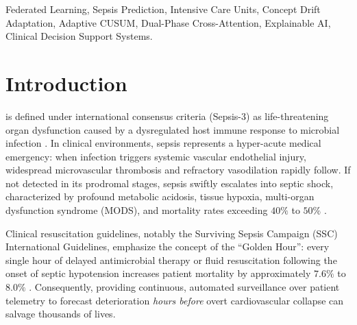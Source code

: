 \documentclass[journal,twocolumn,10pt]{IEEEtran}
\begin{document}
\begin{abstract}
AUPRC of \textbf{0.1043}, lowest ECE of \textbf{0.0902}, and lowest Brier score of \textbf{0.0548}. Paired cluster bootstrap testing confirms statistically equivalent discrimination to centralized BiLSTM ($P = .176$) and personalized Ditto ($P = .459$) while delivering superior probability reliability. Depending on clinical deployment requirements, FPDAF supports flexible operating modes, ranging from an \textbf{Early Bedside Screening mode} ($\tau=0.08$, Sensitivity 80.15\%, Specificity 63.85\%) to a \textbf{High-Confidence Rule-In mode} ($\tau=0.65$, Accuracy 96.20\%, Specificity 97.80\%). In a theoretical 50-round deployment model, CSSP achieves up to 38.0\% communication savings (1.52~GB vs. 2.48~GB in Ditto). Paired with an operational point-of-care Clinical Decision Support System (CDSS) providing temporal window attributions, physiological feature saliency, and counterfactual intervention simulation with a cohort mean early warning lead time of \textbf{4.98 hours} (up to 5.8 hours in exemplar cases), FPDAF provides an empirically grounded, privacy-preserving foundation for decentralized early sepsis surveillance.
\end{abstract}

\begin{IEEEkeywords}
Federated Learning, Sepsis Prediction, Intensive Care Units, Concept Drift Adaptation, Adaptive CUSUM, Dual-Phase Cross-Attention, Explainable AI, Clinical Decision Support Systems.
\end{IEEEkeywords}

\section{Introduction}
 is defined under international consensus criteria (Sepsis-3) as life-threatening organ dysfunction caused by a dysregulated host immune response to microbial infection \cite{singer2016sepsis3}. In clinical environments, sepsis represents a hyper-acute medical emergency: when infection triggers systemic vascular endothelial injury, widespread microvascular thrombosis and refractory vasodilation rapidly follow. If not detected in its prodromal stages, sepsis swiftly escalates into septic shock, characterized by profound metabolic acidosis, tissue hypoxia, multi-organ dysfunction syndrome (MODS), and mortality rates exceeding $40\%$ to $50\%$ \cite{evans2021surviving,dusing2025sepsis}. 

Clinical resuscitation guidelines, notably the Surviving Sepsis Campaign (SSC) International Guidelines, emphasize the concept of the ``Golden Hour'': every single hour of delayed antimicrobial therapy or fluid resuscitation following the onset of septic hypotension increases patient mortality by approximately $7.6\%$ to $8.0\%$ \cite{evans2021surviving}. Consequently, providing continuous, automated surveillance over patient telemetry to forecast deterioration \textit{hours before} overt cardiovascular collapse can salvage thousands of lives.
\end{document}
